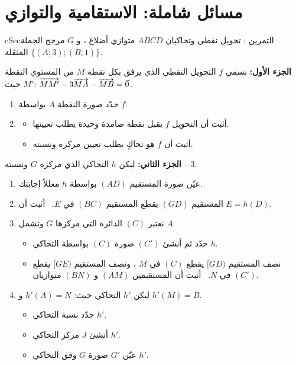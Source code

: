 \documentclass[12pt,a4paper]{article}
\newenvironment{BOX}[2]{\begin{otherlanguage}{english}\begin{arbox}{#1}{#2}}{\end{arbox}\end{otherlanguage}}
\newcounter{exo}
\newenvironment{tamrin}[1]{\stepcounter{exo}\begin{BOX}{cSec}{التمرين \theexo: #1}}{\end{BOX}}
\newenvironment{sq}{\begin{itemize}[leftmargin=2.4em,itemsep=3pt]}{\end{itemize}}
\newcommand{\qa}{\item[(أ)]}\newcommand{\qb}{\item[(ب)]}\newcommand{\qc}{\item[(جـ)]}\newcommand{\qd}{\item[(د)]}\newcommand{\qe}{\item[(هـ)]}
\begin{document}
\section{مسائل شاملة: الاستقامية والتوازي}
\begin{tamrin}{تحويل نقطي وتحاكيان}
$ABCD$ متوازي أضلاع ، و $G$ مرجح الجملة المثقلة $\{(A;3);(B;1)\}$.\par
\textbf{الجزء الأول:} نسمي $f$ التحويل النقطي الذي يرفق بكل نقطة $M$ من المستوي النقطة $M'$ حيث: $\overrightarrow{MM'}-3\overrightarrow{MA}-\overrightarrow{MB}=\vec0$.
\begin{enumerate}
\item حدّد صورة النقطة $A$ بواسطة $f$.
\item
\begin{sq}
\qa أثبت أن التحويل $f$ يقبل نقطة صامدة وحيدة يطلب تعيينها.
\qb أثبت أن $f$ هو تحاكٍ يطلب تعيين مركزه ونسبته.
\end{sq}
\end{enumerate}
\textbf{الجزء الثاني:} ليكن $h$ التحاكي الذي مركزه $G$ ونسبته $-3$.
\begin{enumerate}[resume]
\item عيّن صورة المستقيم $(AD)$ بواسطة $h$ معللاً إجابتك.
\item المستقيم $(GD)$ يقطع المستقيم $(BC)$ في $E$. \ أثبت أن $E=h(D)$.
\item نعتبر $(C)$ الدائرة التي مركزها $G$ وتشمل $A$.
\begin{sq}
\qa حدّد ثم أنشئ $(C')$ صورة $(C)$ بواسطة التحاكي $h$.
\qb نصف المستقيم $[GD)$ يقطع $(C)$ في $M$ ، ونصف المستقيم $[GE)$ يقطع $(C')$ في $N$. \ أثبت أن المستقيمين $(AM)$ و $(BN)$ متوازيان.
\end{sq}
\item ليكن $h'$ التحاكي حيث: $h'(A)=N$ و $h'(M)=B$.
\begin{sq}
\qa حدّد نسبة التحاكي $h'$.
\qb أنشئ $J$ مركز التحاكي $h'$.
\qc عيّن $G'$ صورة $G$ وفق التحاكي $h'$.
\end{sq}
\end{enumerate}
\end{tamrin}
\end{document}

